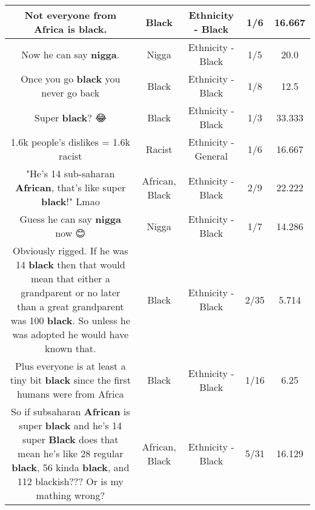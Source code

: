 \documentclass[11pt]{article}
\newlength\mylength
\begin{document}
\begin{center}
\begin{longtable}{|C{.65\mylength}|C{.30\mylength}|C{.12\mylength}|C{.12\mylength}|C{.12\mylength}|}
  \small Not everyone from Africa is \textbf{black}.\normalsize   & Black & Ethnicity - Black & 1/6 & 16.667 \\  \hline
  \small Now he can say \textbf{nigga}.\normalsize   & Nigga & Ethnicity - Black & 1/5 & 20.0 \\  \hline
  \small Once you go \textbf{black} you never go back\normalsize   & Black & Ethnicity - Black & 1/8 & 12.5 \\  \hline
  \small Super \textbf{black}? 😂\normalsize   & Black & Ethnicity - Black & 1/3 & 33.333 \\  \hline
  \small 1.6k people's dislikes = 1.6k racist\normalsize   & Racist & Ethnicity - General & 1/6 & 16.667 \\  \hline
  \small "He's 14 sub-saharan \textbf{African}, that's like super \textbf{black}!" Lmao\normalsize   & African, Black & Ethnicity - Black & 2/9 & 22.222 \\  \hline
  \small Guess he can say \textbf{nigga} now 😊\normalsize   & Nigga & Ethnicity - Black & 1/7 & 14.286 \\  \hline
  \small Obviously rigged. If he was 14 \textbf{black} then that would mean that either a grandparent or no later than a great grandparent was 100 \textbf{black}. So unless he was adopted he would have known that.\normalsize   & Black & Ethnicity - Black & 2/35 & 5.714 \\  \hline
  \small Plus everyone is at least a tiny bit \textbf{black} since the first humans were from Africa\normalsize   & Black & Ethnicity - Black & 1/16 & 6.25 \\  \hline
  \small So if subsaharan \textbf{African} is super \textbf{black} and he's 14 super \textbf{Black} does that mean he's like 28 regular \textbf{black}, 56 kinda \textbf{black}, and 112 blackish??? Or is my mathing wrong?\normalsize   & African, Black & Ethnicity - Black & 5/31 & 16.129 \\  \hline

\end{longtable}
\end{center}
\end{document}
